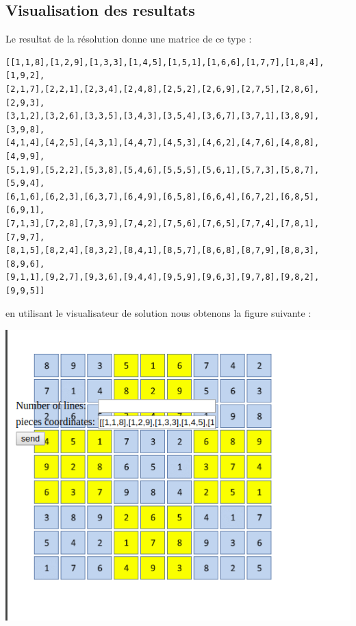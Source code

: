 \documentclass[10pt]{beamer}
\begin{document}
\begin{frame}[fragile]
\section{Visualisation des resultats}
Le resultat de la résolution donne une matrice de ce type : \\
\begin{center}
\begin{tiny}
\begin{verbatim}
[[1,1,8],[1,2,9],[1,3,3],[1,4,5],[1,5,1],[1,6,6],[1,7,7],[1,8,4],[1,9,2],
[2,1,7],[2,2,1],[2,3,4],[2,4,8],[2,5,2],[2,6,9],[2,7,5],[2,8,6],[2,9,3],
[3,1,2],[3,2,6],[3,3,5],[3,4,3],[3,5,4],[3,6,7],[3,7,1],[3,8,9],[3,9,8],
[4,1,4],[4,2,5],[4,3,1],[4,4,7],[4,5,3],[4,6,2],[4,7,6],[4,8,8],[4,9,9],
[5,1,9],[5,2,2],[5,3,8],[5,4,6],[5,5,5],[5,6,1],[5,7,3],[5,8,7],[5,9,4],
[6,1,6],[6,2,3],[6,3,7],[6,4,9],[6,5,8],[6,6,4],[6,7,2],[6,8,5],[6,9,1],
[7,1,3],[7,2,8],[7,3,9],[7,4,2],[7,5,6],[7,6,5],[7,7,4],[7,8,1],[7,9,7],
[8,1,5],[8,2,4],[8,3,2],[8,4,1],[8,5,7],[8,6,8],[8,7,9],[8,8,3],[8,9,6],
[9,1,1],[9,2,7],[9,3,6],[9,4,4],[9,5,9],[9,6,3],[9,7,8],[9,8,2],[9,9,5]]
\end{verbatim}
\end{tiny}
\end{center}

en utilisant le visualisateur de solution nous obtenons la figure suivante :
\begin{center}
\includegraphics[scale=0.3]{sudoku_diabolique_resultats.png}
\end{center}
\end{frame}
\end{document}
